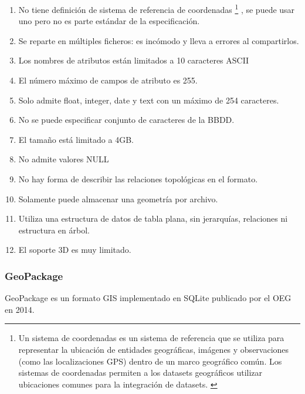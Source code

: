 \begin{enumerate} 
    \item No tiene definición de sistema de referencia de coordenadas \footnote{Un sistema de
            coordenadas es un sistema de referencia que se utiliza para representar la ubicación de entidades
            geográficas, imágenes y observaciones (como las localizaciones GPS) dentro de un marco geográfico
            común. Los sistemas de coordenadas permiten a los datasets geográficos utilizar ubicaciones comunes
            para la integración de datasets. \cite{coordenadas}} 
        , se puede usar uno pero no es parte estándar de la especificación.     
    \item Se reparte en múltiples ficheros: es incómodo y lleva a errores al compartirlos.
    \item Los nombres de atributos están limitados a 10 caracteres ASCII 
    \item El número máximo de campos de atributo es 255.  
    \item Solo admite float, integer, date y text con un máximo de 254 caracteres.  
    \item No se puede especificar conjunto de caracteres de la BBDD.  
    \item El tamaño está limitado a 4GB.  
    \item No admite valores NULL 
    \item No hay forma de describir las relaciones topológicas en el formato.  
    \item Solamente puede almacenar una geometría por archivo.  
    \item Utiliza una estructura de datos de tabla plana, sin jerarquías, relaciones ni estructura en árbol.  
    \item El soporte 3D es muy limitado.  
\end{enumerate}

\subsubsection{GeoPackage}
GeoPackage es un formato GIS implementado en SQLite publicado por el OEG en 2014. \cite{geopackage-spec}
    
